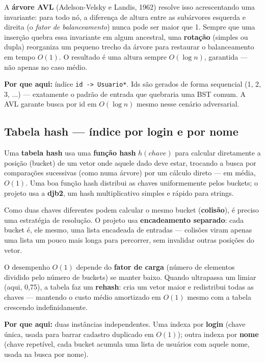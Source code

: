 \documentclass[11pt,a4paper]{article}
\newcommand{\code}[1]{\texttt{#1}}
\begin{document}
A \textbf{árvore AVL} (Adelson-Velsky e Landis, 1962) resolve isso
acrescentando uma invariante: para todo nó, a diferença de altura entre as
subárvores esquerda e direita (o \emph{fator de balanceamento}) nunca pode
ser maior que 1. Sempre que uma inserção quebra essa invariante em algum
ancestral, uma \textbf{rotação} (simples ou dupla) reorganiza um pequeno
trecho da árvore para restaurar o balanceamento em tempo $O(1)$. O resultado
é uma altura sempre $O(\log n)$, garantida --- não apenas no caso médio.

\textbf{Por que aqui:} índice \code{id -> Usuario*}. Ids são gerados de
forma sequencial (1, 2, 3, ...) --- exatamente o padrão de entrada que
quebraria uma BST comum. A AVL garante busca por id em $O(\log n)$ mesmo
nesse cenário adversarial.

\subsection{Tabela hash --- índice por login e por nome}

Uma \textbf{tabela hash} usa uma \textbf{função hash} $h(chave)$ para
calcular diretamente a posição (bucket) de um vetor onde aquele dado deve
estar, trocando a busca por comparações sucessivas (como numa árvore) por um
cálculo direto --- em média, $O(1)$. Uma boa função hash distribui as chaves
uniformemente pelos buckets; o projeto usa a \textbf{djb2}, um hash
multiplicativo simples e rápido para strings.

Como duas chaves diferentes podem calcular o mesmo bucket
(\textbf{colisão}), é preciso uma estratégia de resolução. O projeto usa
\textbf{encadeamento separado}: cada bucket é, ele mesmo, uma lista
encadeada de entradas --- colisões viram apenas uma lista um pouco mais
longa para percorrer, sem invalidar outras posições do vetor.

O desempenho $O(1)$ depende do \textbf{fator de carga} (número de elementos
dividido pelo número de buckets) se manter baixo. Quando ultrapassa um
limiar (aqui, 0,75), a tabela faz um \textbf{rehash}: cria um vetor maior e
redistribui todas as chaves --- mantendo o custo médio amortizado em
$O(1)$ mesmo com a tabela crescendo indefinidamente.

\textbf{Por que aqui:} duas instâncias independentes. Uma indexa por
\textbf{login} (chave única, usada para barrar cadastro duplicado em
$O(1)$); outra indexa por \textbf{nome} (chave repetível, cada bucket
acumula uma lista de usuários com aquele nome, usada na busca por nome).
\end{document}
